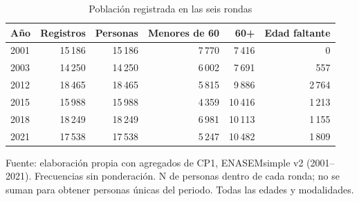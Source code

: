\begin{table}[!htbp]
\centering
\caption{Población registrada en las seis rondas}\label{tab:cp1-rondas}
\small\setlength{\tabcolsep}{4pt}
\renewcommand{\arraystretch}{1.15}
\begin{tabular}{lrrrrr}
\toprule
\textbf{Año} & \textbf{Registros} & \textbf{Personas} & \textbf{Menores de 60} & \textbf{60+} & \textbf{Edad faltante} \\
\midrule
2001 & 15\,186 & 15\,186 & 7\,770 & 7\,416 & 0 \\
2003 & 14\,250 & 14\,250 & 6\,002 & 7\,691 & 557 \\
2012 & 18\,465 & 18\,465 & 5\,815 & 9\,886 & 2\,764 \\
2015 & 15\,988 & 15\,988 & 4\,359 & 10\,416 & 1\,213 \\
2018 & 18\,249 & 18\,249 & 6\,981 & 10\,113 & 1\,155 \\
2021 & 17\,538 & 17\,538 & 5\,247 & 10\,482 & 1\,809 \\
\bottomrule
\end{tabular}
\par\medskip
\parbox{\linewidth}{\footnotesize Fuente: elaboración propia con agregados de CP1, ENASEMsimple v2 (2001--2021). Frecuencias sin ponderación. N de personas dentro de cada ronda; no se suman para obtener personas únicas del periodo. Todas las edades y modalidades.}
\end{table}
